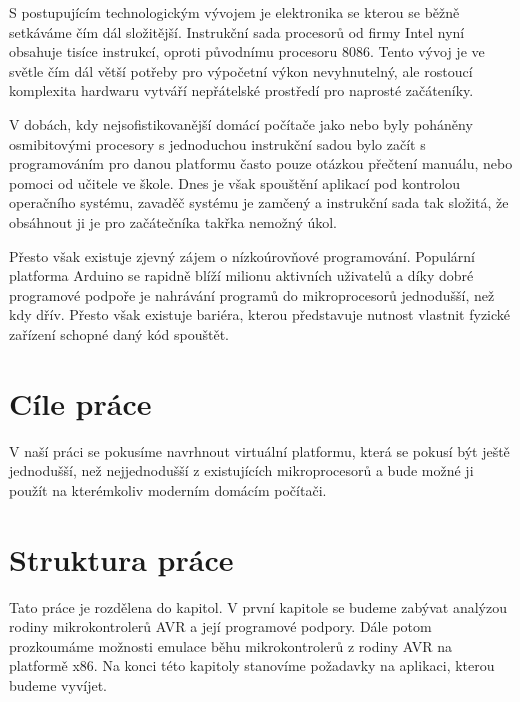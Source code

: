 \begin{introduction}

S postupujícím technologickým vývojem je elektronika se kterou se běžně setkáváme čím dál složitější. Instrukční sada procesorů od firmy Intel nyní obsahuje tisíce instrukcí\cite{x86-instructions}, oproti původnímu procesoru 8086\cite{8086-instructions}. Tento vývoj je ve světle čím dál větší potřeby pro výpočetní výkon nevyhnutelný, ale rostoucí komplexita hardwaru vytváří nepřátelské prostředí pro naprosté začáteníky.

V dobách, kdy nejsofistikovanější domácí počítače jako  nebo  byly poháněny osmibitovými procesory s jednoduchou instrukční sadou bylo začít s programováním pro danou platformu často pouze otázkou přečtení manuálu, nebo pomoci od učitele ve škole. Dnes je však spouštění aplikací pod kontrolou operačního systému, zavaděč systému je zamčený a instrukční sada tak složitá, že obsáhnout ji je pro začátečníka takřka nemožný úkol.

Přesto však existuje zjevný zájem o nízkoúrovňové programování. Populární platforma Arduino se rapidně blíží milionu aktivních uživatelů a díky dobré programové podpoře je nahrávání programů do mikroprocesorů jednodušší, než kdy dřív. Přesto však existuje bariéra, kterou představuje nutnost vlastnit fyzické zařízení schopné daný kód spouštět.

\section{Cíle práce}

V naší práci se pokusíme navrhnout virtuální platformu, která se pokusí být ještě jednodušší, než nejjednodušší z existujících mikroprocesorů a bude možné ji použít na kterémkoliv moderním domácím počítači.


\section{Struktura práce}

Tato práce je rozdělena do  kapitol. V první kapitole se budeme zabývat analýzou rodiny mikrokontrolerů AVR a její programové podpory. Dále potom prozkoumáme možnosti emulace běhu mikrokontrolerů z rodiny AVR na platformě x86. Na konci této kapitoly stanovíme požadavky na aplikaci, kterou budeme vyvíjet.


\end{introduction}
